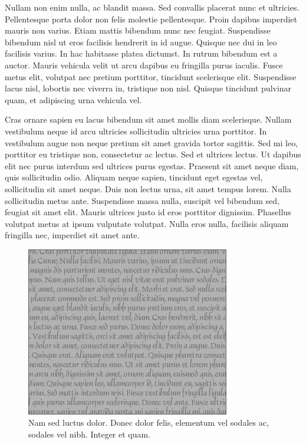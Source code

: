 Nullam non enim nulla, ac blandit massa.
Sed convallis placerat nunc et ultricies.
Pellentesque porta dolor non felis molestie pellentesque.
Proin dapibus imperdiet mauris non varius.
Etiam mattis bibendum nunc nec feugiat.
Suspendisse bibendum nisl ut eros facilisis hendrerit in id augue.
Quisque nec dui in leo facilisis varius.
In hac habitasse platea dictumst.
In rutrum bibendum est a auctor.
Mauris vehicula velit ut arcu dapibus eu fringilla purus iaculis.
Fusce metus elit, volutpat nec pretium porttitor, tincidunt scelerisque elit.
Suspendisse lacus nisl, lobortis nec viverra in, tristique non nisl.
Quisque tincidunt pulvinar quam, et adipiscing urna vehicula vel.

Cras ornare sapien eu lacus bibendum sit amet mollis diam scelerisque.
Nullam vestibulum neque id arcu ultricies sollicitudin ultricies urna porttitor.
In vestibulum augue non neque pretium sit amet gravida tortor sagittis.
Sed mi leo, porttitor eu tristique non, consectetur ac lectus.
Sed et ultrices lectus.
Ut dapibus elit nec purus interdum sed ultrices purus egestas.
Praesent sit amet neque diam, quis sollicitudin odio.
Aliquam neque sapien, tincidunt eget egestas vel, sollicitudin sit amet neque.
Duis non lectus urna, sit amet tempus lorem.
Nulla sollicitudin metus ante.
Suspendisse massa nulla, suscipit vel bibendum sed, feugiat sit amet elit.
Mauris ultrices justo id eros porttitor dignissim.
Phasellus volutpat metus at ipsum vulputate volutpat.
Nulla eros nulla, facilisis aliquam fringilla nec, imperdiet sit amet ante.

\begin{figure}[t]
  \centering
  \includegraphics{figs/large-rectangle-gray}
  \caption[Nam sed luctus dolor]{
    Nam sed luctus dolor.
Donec dolor felis, elementum vel sodales ac, sodales vel nibh.
Integer et quam.
  }
\end{figure}

